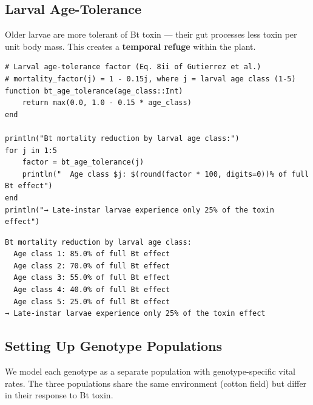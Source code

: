\subsection{Larval Age-Tolerance}



\label{4231960590042393597}{}


Older larvae are more tolerant of Bt toxin — their gut processes less toxin per unit body mass. This creates a \textbf{temporal refuge} within the plant.




\begin{verbatim}
# Larval age-tolerance factor (Eq. 8ii of Gutierrez et al.)
# mortality_factor(j) = 1 - 0.15j, where j = larval age class (1-5)
function bt_age_tolerance(age_class::Int)
    return max(0.0, 1.0 - 0.15 * age_class)
end

println("Bt mortality reduction by larval age class:")
for j in 1:5
    factor = bt_age_tolerance(j)
    println("  Age class $j: $(round(factor * 100, digits=0))% of full Bt effect")
end
println("→ Late-instar larvae experience only 25% of the toxin effect")
\end{verbatim}




\begin{verbatim}
Bt mortality reduction by larval age class:
  Age class 1: 85.0% of full Bt effect
  Age class 2: 70.0% of full Bt effect
  Age class 3: 55.0% of full Bt effect
  Age class 4: 40.0% of full Bt effect
  Age class 5: 25.0% of full Bt effect
→ Late-instar larvae experience only 25% of the toxin effect
\end{verbatim}



\subsection{Setting Up Genotype Populations}



\label{3865393644641229617}{}


We model each genotype as a separate population with genotype-specific vital rates. The three populations share the same environment (cotton field) but differ in their response to Bt toxin.





